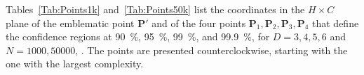 \documentclass[alpha-refs]{wiley-article}
\begin{document}
Tables~\ref{Tab:Points1k} and~\ref{Tab:Points50k} list the coordinates in the $H\times C$ plane
of the emblematic point $\bm P'$ and of the four points $\bm P_1,\bm P_2,\bm P_3,\bm P_4$ that define the confidence regions at \SI{90}{\percent}, \SI{95}{\percent}, \SI{99}{\percent}, and \SI{99.9}{\percent}, 
for $D=3,4,5,6$ and $N=1000,50000$, .
The points are presented counterclockwise, starting with the one with the largest complexity. 

\end{document}
